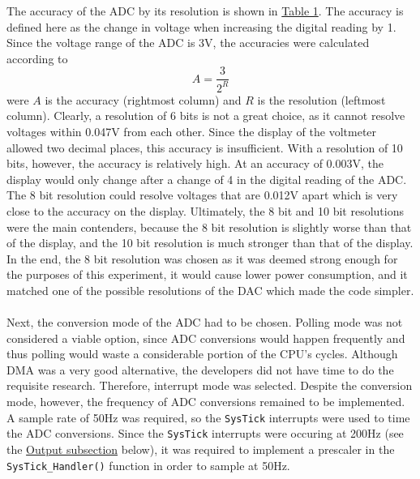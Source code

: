 \documentclass[12pt]{report}
\begin{document}
The accuracy of the ADC by its resolution is shown in \hyperref[adcres]{Table 1}. The accuracy is
defined here as the change in voltage when increasing the digital reading by 1. Since the voltage
range of the ADC is 3V, the accuracies were calculated according to
\begin{equation}
	A = \frac{3}{2^{R}}
\end{equation}
were $A$ is the accuracy (rightmost column) and $R$ is the resolution (leftmost column). Clearly, a
resolution of 6 bits is not a great choice, as it cannot resolve voltages within 0.047V from each
other. Since the display of the voltmeter allowed two decimal places, this accuracy is insufficient.
With a resolution of 10 bits, however, the accuracy is relatively high. At an accuracy of 0.003V,
the display would only change after a change of 4 in the digital reading of the ADC. The 8 bit
resolution could resolve voltages that are 0.012V apart which is very close to the accuracy on the
display. Ultimately, the 8 bit and 10 bit resolutions were the main contenders, because the 8 bit
resolution is slightly worse than that of the display, and the 10 bit resolution is much stronger
than that of the display. In the end, the 8 bit resolution was chosen as it was deemed strong enough
for the purposes of this experiment, it would cause lower power consumption, and it matched one of
the possible resolutions of the DAC which made the code simpler.\\\\
Next, the conversion mode of the ADC had to be chosen. Polling mode was not considered a viable
option, since ADC conversions would happen frequently and thus polling would waste a considerable
portion of the CPU's cycles. Although DMA was a very good alternative, the developers did not have
time to do the requisite research. Therefore, interrupt mode was selected. Despite the conversion
mode, however, the frequency of ADC conversions remained to be implemented. A sample rate of 50Hz
was required, so the \texttt{SysTick} interrupts were used to time the ADC conversions. Since the
\texttt{SysTick} interrupts were occuring at 200Hz (see the \hyperref[output]{Output subsection} below), it was
required to implement a prescaler in the \texttt{SysTick\_Handler()} function in order to sample at
50Hz.
\end{document}
